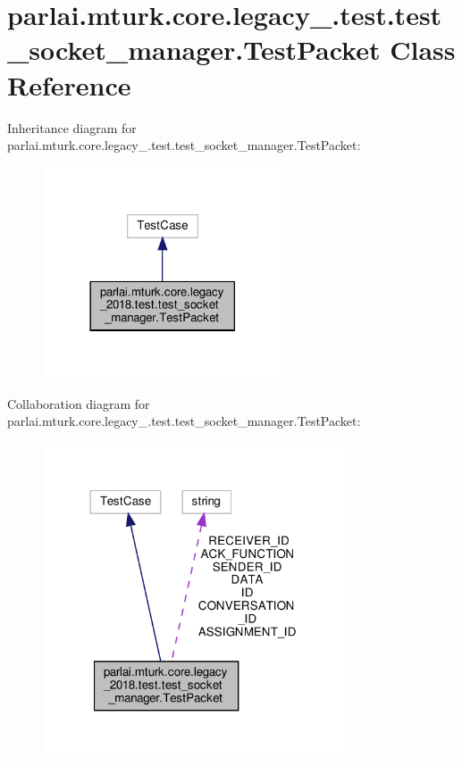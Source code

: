 \hypertarget{classparlai_1_1mturk_1_1core_1_1legacy__2018_1_1test_1_1test__socket__manager_1_1TestPacket}{}\section{parlai.\+mturk.\+core.\+legacy\+\_.\+test.\+test\+\_\+socket\+\_\+manager.\+Test\+Packet Class Reference}
\label{classparlai_1_1mturk_1_1core_1_1legacy__2018_1_1test_1_1test__socket__manager_1_1TestPacket}


Inheritance diagram for parlai.\+mturk.\+core.\+legacy\+\_.\+test.\+test\+\_\+socket\+\_\+manager.\+Test\+Packet\+:
\nopagebreak
\begin{figure}[H]
\begin{center}
\leavevmode
\includegraphics[width=201pt]{classparlai_1_1mturk_1_1core_1_1legacy__2018_1_1test_1_1test__socket__manager_1_1TestPacket__inherit__graph}
\end{center}
\end{figure}


Collaboration diagram for parlai.\+mturk.\+core.\+legacy\+\_.\+test.\+test\+\_\+socket\+\_\+manager.\+Test\+Packet\+:
\nopagebreak
\begin{figure}[H]
\begin{center}
\leavevmode
\includegraphics[width=254pt]{classparlai_1_1mturk_1_1core_1_1legacy__2018_1_1test_1_1test__socket__manager_1_1TestPacket__coll__graph}
\end{center}
\end{figure}
